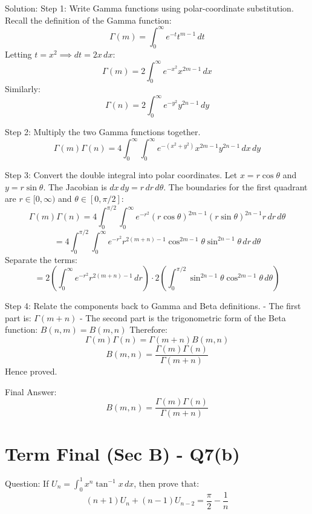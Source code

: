\documentclass{article}
\begin{document}
Solution:
Step 1: Write Gamma functions using polar-coordinate substitution.
Recall the definition of the Gamma function:
\[
\Gamma(m) = \int_0^\infty e^{-t} t^{m-1} \, dt
\]
Letting $t = x^2 \implies dt = 2x \, dx$:
\[
\Gamma(m) = 2 \int_0^\infty e^{-x^2} x^{2m-1} \, dx
\]
Similarly:
\[
\Gamma(n) = 2 \int_0^\infty e^{-y^2} y^{2n-1} \, dy
\]

Step 2: Multiply the two Gamma functions together.
\[
\Gamma(m)\Gamma(n) = 4 \int_0^\infty \int_0^\infty e^{-(x^2+y^2)} x^{2m-1} y^{2n-1} \, dx \, dy
\]

Step 3: Convert the double integral into polar coordinates.
Let $x = r\cos\theta$ and $y = r\sin\theta$. The Jacobian is $dx \, dy = r \, dr \, d\theta$.
The boundaries for the first quadrant are $r \in [0, \infty)$ and $\theta \in [0, \pi/2]$:
\[
\Gamma(m)\Gamma(n) = 4 \int_0^{\pi/2} \int_0^\infty e^{-r^2} (r\cos\theta)^{2m-1} (r\sin\theta)^{2n-1} r \, dr \, d\theta
\]
\[
= 4 \int_0^{\pi/2} \int_0^\infty e^{-r^2} r^{2(m+n)-1} \cos^{2m-1}\theta \sin^{2n-1}\theta \, dr \, d\theta
\]
Separate the terms:
\[
= 2 \left( \int_0^\infty e^{-r^2} r^{2(m+n)-1} \, dr \right) \cdot 2 \left( \int_0^{\pi/2} \sin^{2n-1}\theta \cos^{2m-1}\theta \, d\theta \right)
\]

Step 4: Relate the components back to Gamma and Beta definitions.
- The first part is: $\Gamma(m+n)$
- The second part is the trigonometric form of the Beta function: $B(n, m) = B(m, n)$
Therefore:
\[
\Gamma(m)\Gamma(n) = \Gamma(m+n) B(m, n)
\]
\[
B(m, n) = \frac{\Gamma(m)\Gamma(n)}{\Gamma(m+n)}
\]
Hence proved.

Final Answer:
\[
\boxed{B(m, n) = \frac{\Gamma(m)\Gamma(n)}{\Gamma(m+n)}}
\]

\section*{Term Final (Sec B) - Q7(b)}
Question:
If $U_n = \int_0^1 x^n \tan^{-1} x \, dx$, then prove that:
\[
(n+1)U_n + (n-1)U_{n-2} = \frac{\pi}{2} - \frac{1}{n}
\]
\end{document}
